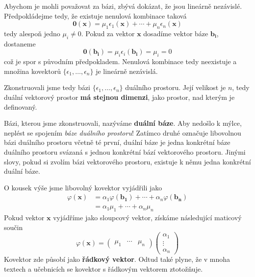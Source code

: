 \documentclass[a5paper,12pt]{amsbook}
\theoremstyle{definition}
\newcommand{\myscalar}[1]{#1}
\newcommand{\myvec}[1]{\mathbf{#1}}
\newcommand{\mymap}[1]{#1}
\begin{document}
Abychom je mohli považovat za bázi, zbývá dokázat, že jsou lineárně nezávislé. Předpokládejme tedy,
že existuje nenulová kombinace taková
\begin{equation*}
\myvec{0}(\myvec{x}) = \myscalar{\mu_1}\mymap{\epsilon_1}(\myvec{x}) + \cdots 
  + \myscalar{\mu_n}\mymap{\epsilon_n}(\myvec{x})
\end{equation*}
tedy alespoň jedno $\myscalar{\mu_i} \neq 0$. Pokud za vektor $\myvec{x}$ dosadíme vektor báze
$\myvec{b_i}$, dostaneme
\begin{equation*}
\myvec{0}(\myvec{b_i}) = \myscalar{\mu_i}\mymap{\epsilon_i}(\myvec{b_i}) = \myscalar{\mu_i} = 0
\end{equation*}
což je spor s původním předpokladem. Nenulová kombinace tedy neexistuje a množina kovektorů
$\{\mymap{\epsilon_1}, \ldots, \mymap{\epsilon_n}\}$ je lineárně nezávislá.

Zkonstruovali jsme tedy bázi $\{\mymap{\epsilon_1}, \ldots, \mymap{\epsilon_n}\}$ duálního prostoru.
Její velikost je $n$, tedy duální vektorový prostor \textbf{má stejnou dimenzi}, jako prostor, nad
kterým je definovaný.

Bázi, kterou jsme zkonstruovali, nazýváme \textbf{duální báze}. Aby nedošlo k mýlce, neplést se
spojením \textit{báze duálního prostoru}! Zatímco druhé označuje libovolnou bázi duálního
prostoru včetně té první, duální báze je jedna konkrétní báze duálního prostoru svázaná s
jednou konkrétní bází vektorového prostoru. Jinými slovy, pokud si zvolím bázi vektorového
prostoru, existuje k němu jedna konkrétní duální báze.

O kousek výše jsme libovolný kovektor vyjádřili jako
\begin{equation*}
\begin{split}
\mymap{\varphi}(\myvec{x}) &= \myscalar{\alpha_1}\mymap{\varphi}(\myvec{b_1}) + \cdots
  + \myscalar{\alpha_n}\mymap{\varphi}(\myvec{b_n}) \\
&= \myscalar{\alpha_1}\myscalar{\mu_1} + \cdots + \myscalar{\alpha_n}\myscalar{\mu_n}
\end{split}
\end{equation*}
Pokud vektor $\myvec{x}$ vyjádříme jako sloupcový vektor, získáme následující maticový součin
\begin{equation*}
\mymap{\varphi}(\myvec{x}) = \left(\begin{array}{ccc}
\myscalar{\mu_1} & \cdots & \myscalar{\mu_n}
\end{array}\right)\left(\begin{array}{c}
\myscalar{\alpha_1}\\
\vdots\\
\myscalar{\alpha_n}
\end{array}\right)
\end{equation*}
Kovektor zde působí jako \textbf{řádkový vektor}. Odtud také plyne, že v mnoha textech a učebnicích
se kovektor s řádkovým vektorem ztotožňuje.
\end{document}
